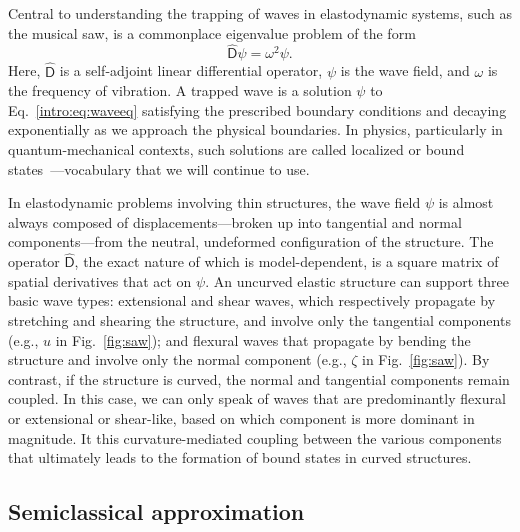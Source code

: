 Central to understanding the trapping of waves in elastodynamic systems, such as the musical saw, is a commonplace eigenvalue problem of the form
%
\begin{equation}
  \widehat{\mathsf{D}}\psi = \omega^{2}\psi.
  \label{intro:eq:waveeq}
\end{equation}
%
Here, $\widehat{\mathsf{D}}$ is a self-adjoint linear differential operator, $\psi$ is the wave field, and $\omega$ is the frequency of vibration.
A trapped wave is a solution $\psi$ to Eq.~\eqref{intro:eq:waveeq} satisfying the prescribed boundary conditions and decaying exponentially as we approach the physical boundaries.
In physics, particularly in quantum-mechanical contexts, such solutions are called localized or bound states~\cite{ravendranadhan1989,ravendranadhan1993,ravendranadhan1994}---vocabulary that we will continue to use.

In elastodynamic problems involving thin structures, the wave field $\psi$ is almost always composed of displacements---broken up into tangential and normal components---from the neutral, undeformed configuration of the structure.
The operator $\widehat{\mathsf{D}}$, the exact nature of which is model-dependent, is a square matrix of spatial derivatives that act on $\psi$.
An uncurved elastic structure can support three basic wave types: extensional and shear waves, which respectively propagate by stretching and shearing the structure, and involve only the tangential components (e.g., $u$ in Fig.~\ref{fig:saw}); and flexural waves that propagate by bending the structure and involve only the normal component (e.g., $\zeta$ in Fig.~\ref{fig:saw}).
By contrast, if the structure is curved, the normal and tangential components remain coupled.
In this case, we can only speak of waves that are predominantly flexural or extensional or shear-like, based on which component is more dominant in magnitude.
It this curvature-mediated coupling between the various components that ultimately leads to the formation of bound states in curved structures.

\subsection{Semiclassical approximation}

